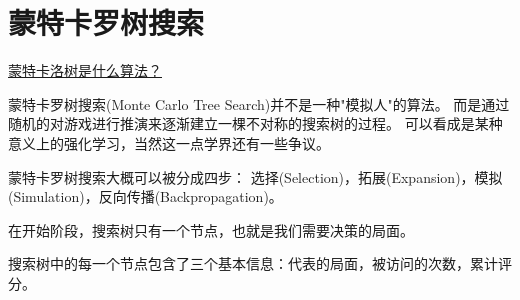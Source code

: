 \section{蒙特卡罗树搜索}
\href{https://www.zhihu.com/question/39916945}{蒙特卡洛树是什么算法？}


蒙特卡罗树搜索(Monte Carlo Tree Search)并不是一种"模拟人"的算法。
而是通过随机的对游戏进行推演来逐渐建立一棵不对称的搜索树的过程。
可以看成是某种意义上的强化学习，当然这一点学界还有一些争议。

蒙特卡罗树搜索大概可以被分成四步：
选择(Selection)，拓展(Expansion)，模拟(Simulation)，反向传播(Backpropagation)。

在开始阶段，搜索树只有一个节点，也就是我们需要决策的局面。

搜索树中的每一个节点包含了三个基本信息：代表的局面，被访问的次数，累计评分。

